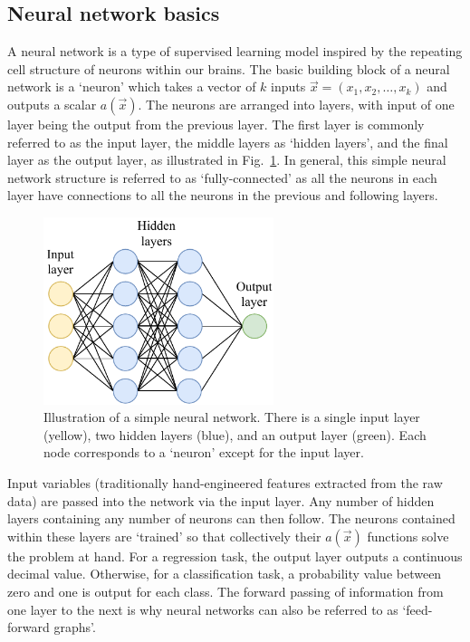 \subsection{Neural network basics} %
\label{sec:cvn_theory_basics} %

A neural network is a type of supervised learning model inspired by the repeating cell structure
of neurons within our brains. The basic building block of a neural network is a `neuron' which
takes a vector of $k$ inputs $\vec{x} = (x_{1}, x_{2},\dots,x_{k})$ and outputs a scalar
$a(\vec{x})$. The neurons are arranged into layers, with input of one layer being the output from
the previous layer. The first layer is commonly referred to as the input layer, the middle layers
as `hidden layers', and the final layer as the output layer, as illustrated in
Fig.~\ref{fig:network}. In general, this simple neural network structure is referred to as
`fully-connected' as all the neurons in each layer have connections to all the neurons in the
previous and following layers.

\begin{figure} %
    \includegraphics[width=0.6\textwidth]{diagrams/6-cvn/network.pdf}
    \caption[Illustration of a simple neural network]
    {Illustration of a simple neural network. There is a single input layer (yellow), two hidden
        layers (blue), and an output layer (green). Each node corresponds to a `neuron' except for
        the input layer.}
    \label{fig:network}
\end{figure}

Input variables (traditionally hand-engineered features extracted from the raw data) are passed
into the network via the input layer. Any number of hidden layers containing any number of neurons
can then follow. The neurons contained within these layers are `trained' so that collectively
their $a(\vec{x})$ functions solve the problem at hand. For a regression task, the output layer
outputs a continuous decimal value. Otherwise, for a classification task, a probability value
between zero and one is output for each class. The forward passing of information from one layer
to the next is why neural networks can also be referred to as `feed-forward graphs'.

